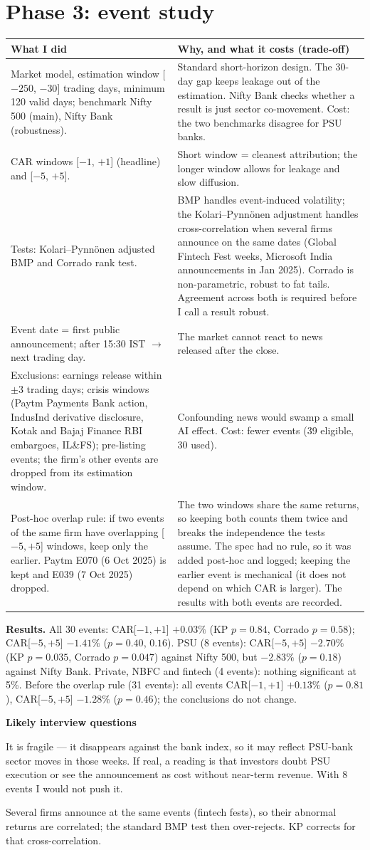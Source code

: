 \documentclass[10.5pt,a4paper]{article}
\newenvironment{decisions}{%
  \begin{longtable}{L{0.36\textwidth} L{0.58\textwidth}}
  \toprule
  \textcolor{head}{\textbf{What I did}} & \textcolor{head}{\textbf{Why, and what it costs (trade-off)}}\\
  \midrule\endhead}{%
  \end{longtable}}
\newcommand{\row}[2]{#1 & #2\\ \midrule}
\newenvironment{qa}{\par\noindent\textcolor{qcol}{\textbf{Likely interview questions}}\begin{description}[font=\normalfont\itshape,leftmargin=0pt,style=nextline]}{\end{description}}
\newcommand{\q}[2]{\item[``#1'']#2}
\begin{document}
\section{Phase 3: event study}
\begin{decisions}
\row{Market model, estimation window [$-250$, $-30$] trading days, minimum 120 valid days; benchmark Nifty 500 (main),
Nifty Bank (robustness).}
{Standard short-horizon design. The 30-day gap keeps leakage out of the estimation. Nifty Bank checks whether a result is
just sector co-movement. Cost: the two benchmarks disagree for PSU banks.}
\row{CAR windows [$-1$, $+1$] (headline) and [$-5$, $+5$].}
{Short window = cleanest attribution; the longer window allows for leakage and slow diffusion.}
\row{Tests: Kolari--Pynn\"onen adjusted BMP and Corrado rank test.}
{BMP handles event-induced volatility; the Kolari--Pynn\"onen adjustment handles cross-correlation when several firms
announce on the same dates (Global Fintech Fest weeks, Microsoft India announcements in Jan 2025). Corrado is
non-parametric, robust to fat tails. Agreement across both is required before I call a result robust.}
\row{Event date = first public announcement; after 15:30 IST $\rightarrow$ next trading day.}
{The market cannot react to news released after the close.}
\row{Exclusions: earnings release within $\pm3$ trading days; crisis windows (Paytm Payments Bank action, IndusInd
derivative disclosure, Kotak and Bajaj Finance RBI embargoes, IL\&FS); pre-listing events; the firm's other events are
dropped from its estimation window.}
{Confounding news would swamp a small AI effect. Cost: fewer events (39 eligible, 30 used).}
\row{Post-hoc overlap rule: if two events of the same firm have overlapping [$-5,+5$] windows, keep only the earlier.
Paytm E070 (6 Oct 2025) is kept and E039 (7 Oct 2025) dropped.}
{The two windows share the same returns, so keeping both counts them twice and breaks the independence the tests
assume. The spec had no rule, so it was added post-hoc and logged; keeping the earlier event is mechanical (it does not
depend on which CAR is larger). The results with both events are recorded.}
\end{decisions}
\textbf{Results.} All 30 events: CAR[$-1,+1$] $+0.03\%$ (KP $p=0.84$, Corrado $p=0.58$); CAR[$-5,+5$] $-1.41\%$
($p=0.40$, $0.16$). PSU (8 events): CAR[$-5,+5$] $-2.70\%$ (KP $p=0.035$, Corrado $p=0.047$) against Nifty 500, but
$-2.83\%$ ($p=0.18$) against Nifty Bank. Private, NBFC and fintech (4 events): nothing significant at 5\%. Before the
overlap rule (31 events): all events CAR[$-1,+1$] $+0.13\%$ ($p=0.81$), CAR[$-5,+5$] $-1.28\%$ ($p=0.46$); the
conclusions do not change.
\begin{qa}
\q{Why might PSU AI announcements see negative returns?}{It is fragile --- it disappears against the bank index, so it
may reflect PSU-bank sector moves in those weeks. If real, a reading is that investors doubt PSU execution or see the
announcement as cost without near-term revenue. With 8 events I would not push it.}
\q{Why the Kolari--Pynn\"onen adjustment?}{Several firms announce at the same events (fintech fests), so their abnormal
returns are correlated; the standard BMP test then over-rejects. KP corrects for that cross-correlation.}
\end{qa}
\end{document}

